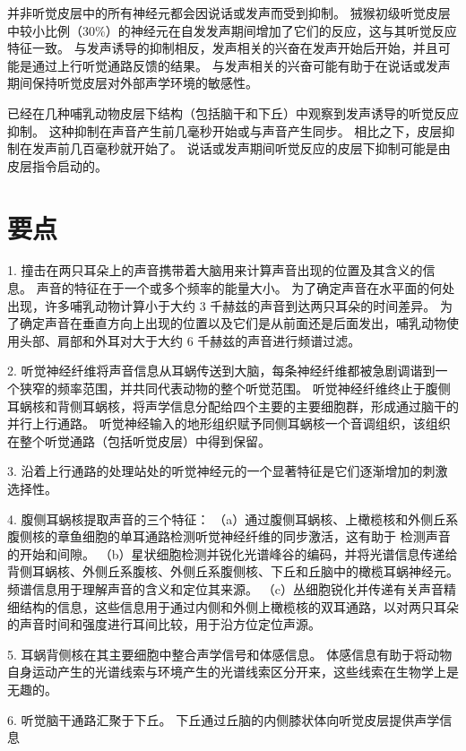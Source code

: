 并非听觉皮层中的所有神经元都会因说话或发声而受到抑制。
狨猴初级听觉皮层中较小比例（30\%）的神经元在自发发声期间增加了它们的反应，这与其听觉反应特征一致。
与发声诱导的抑制相反，发声相关的兴奋在发声开始后开始，并且可能是通过上行听觉通路反馈的结果。
与发声相关的兴奋可能有助于在说话或发声期间保持听觉皮层对外部声学环境的敏感性。


已经在几种哺乳动物皮层下结构（包括脑干和下丘）中观察到发声诱导的听觉反应抑制。
这种抑制在声音产生前几毫秒开始或与声音产生同步。
相比之下，皮层抑制在发声前几百毫秒就开始了。
说话或发声期间听觉反应的皮层下抑制可能是由皮层指令启动的。



\section{要点}

1. 撞击在两只耳朵上的声音携带着大脑用来计算声音出现的位置及其含义的信息。
声音的特征在于一个或多个频率的能量大小。
为了确定声音在水平面的何处出现，许多哺乳动物计算小于大约 3 千赫兹的声音到达两只耳朵的时间差异。
为了确定声音在垂直方向上出现的位置以及它们是从前面还是后面发出，哺乳动物使用头部、肩部和外耳对大于大约 6 千赫兹的声音进行频谱过滤。 


2. 听觉神经纤维将声音信息从耳蜗传送到大脑，每条神经纤维都被急剧调谐到一个狭窄的频率范围，并共同代表动物的整个听觉范围。
听觉神经纤维终止于腹侧耳蜗核和背侧耳蜗核，将声学信息分配给四个主要的主要细胞群，形成通过脑干的并行上行通路。
听觉神经输入的地形组织赋予同侧耳蜗核一个音调组织，该组织在整个听觉通路（包括听觉皮层）中得到保留。


3. 沿着上行通路的处理站处的听觉神经元的一个显著特征是它们逐渐增加的刺激选择性。


4. 腹侧耳蜗核提取声音的三个特征：
（a）通过腹侧耳蜗核、上橄榄核和外侧丘系腹侧核的章鱼细胞的单耳通路检测听觉神经纤维的同步激活，这有助于 检测声音的开始和间隙。
（b）星状细胞检测并锐化光谱峰谷的编码，并将光谱信息传递给背侧耳蜗核、外侧丘系腹核、外侧丘系腹侧核、下丘和丘脑中的橄榄耳蜗神经元。 
频谱信息用于理解声音的含义和定位其来源。 
（c）丛细胞锐化并传递有关声音精细结构的信息，这些信息用于通过内侧和外侧上橄榄核的双耳通路，以对两只耳朵的声音时间和强度进行耳间比较，用于沿方位定位声源。


5. 耳蜗背侧核在其主要细胞中整合声学信号和体感信息。
体感信息有助于将动物自身运动产生的光谱线索与环境产生的光谱线索区分开来，这些线索在生物学上是无趣的。


6. 听觉脑干通路汇聚于下丘。
下丘通过丘脑的内侧膝状体向听觉皮层提供声学信息

